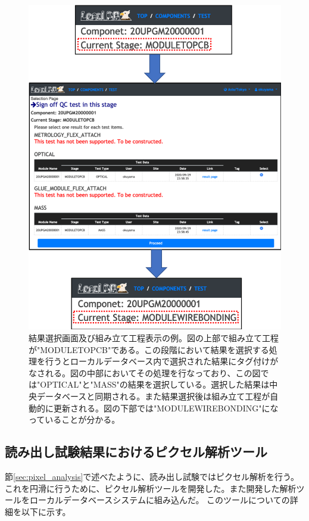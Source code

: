 \begin{figure}[bpt]\centering
\includegraphics[width=14cm]{./webapp_sign_off.png}
\caption[結果選択画面及び組み立て工程表示の例]{結果選択画面及び組み立て工程表示の例。図の上部で組み立て工程が"MODULETOPCB"である。この段階において結果を選択する処理を行うとローカルデータベース内で選択された結果にタグ付けがなされる。図の中部においてその処理を行なっており、この図では"OPTICAL"と"MASS"の結果を選択している。選択した結果は中央データベースと同期される。また結果選択後は組み立て工程が自動的に更新される。図の下部では"MODULEWIREBONDING"になっていることが分かる。}
\label{webapp_sign_off}
\end{figure}

\clearpage

\newpage
\subsection{読み出し試験結果におけるピクセル解析ツール}
節\ref{sec:pixel_analysis}で述べたように、読み出し試験ではピクセル解析を行う。
これを円滑に行うために、ピクセル解析ツールを開発した。また開発した解析ツールをローカルデータベースシステムに組み込んだ。
このツールについての詳細を以下に示す。

